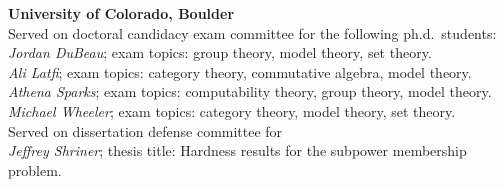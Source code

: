         
    \noindent \textbf{University of Colorado, Boulder}\\[2pt]
    \noindent Served on doctoral candidacy exam committee for the following ph.d.~students:\\[2pt]
    \textit{Jordan DuBeau}; exam topics: group theory, model theory, set theory.\\ [0pt]
    \textit{Ali Latfi}; exam topics: category theory, commutative algebra, model theory.\\[0pt]
    \textit{Athena Sparks}; exam topics: computability theory, group theory, model theory.\\[0pt]
    \textit{Michael Wheeler}; exam topics: category theory, model theory, set theory.\\[4pt]
    \noindent Served on dissertation defense committee for\\
    \textit{Jeffrey Shriner}; thesis title: Hardness results for the subpower membership problem.

